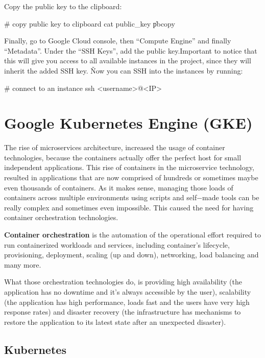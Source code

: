 Copy the public key to the clipboard:
\begin{bash}
# copy public key to clipboard
cat \<public\_key\> \| pbcopy
\end{bash}

Finally, go to Google Cloud console, then ``Compute Engine'' and finally ``Metadata''. Under the ``SSH Keys'', add
the public key.Important to notice that this will give you access to all available instances in the project, since
they will inherit the added SSH key. \v

Now you can SSH into the instances by running:
\begin{bash}
# connect to an instance
ssh <username>@<IP>
\end{bash}

\section{Google Kubernetes Engine (GKE)}

The rise of microservices architecture, increased the usage of container technologies, because the containers
actually offer the perfect host for small independent applications. This rise of containers in the microservice
technology, resulted in applications that are now comprised of hundreds or sometimes maybe even thousands of
containers. As it makes sense, managing those loads of containers across multiple environments using scripts and
self$-$made tools can be really complex and sometimes even impossible. This caused the need for having container
orchestration technologies.

\textbf{Container orchestration} is the automation of the operational effort required to run containerized workloads
and services, including container's lifecycle, provisioning, deployment, scaling (up and down), networking, load
balancing and many more.
\ed

What those orchestration technologies do, is providing high availability (the application has no downtime and it's
always accessible by the user), scalability (the application has high performance, loads fast and the users have very
high response rates) and disaster recovery (the infrastructure has mechanisms to restore the application to its
latest state after an unexpected disaster).

\subsection{Kubernetes}

